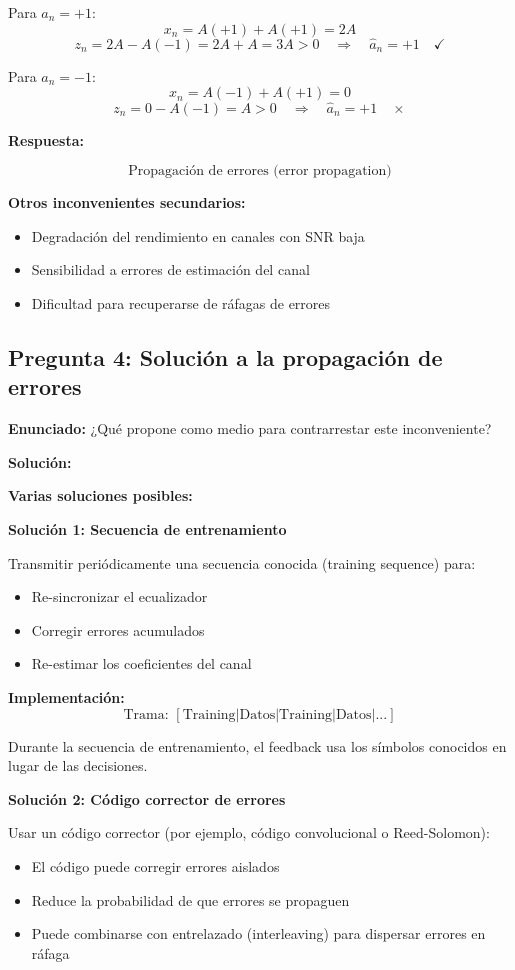 \documentclass[11pt,a4paper]{article}
\begin{document}
Para $a_n = +1$:
\[
x_n = A(+1) + A(+1) = 2A
\]
\[
z_n = 2A - A(-1) = 2A + A = 3A > 0 \quad \Rightarrow \quad \hat{a}_n = +1 \quad \checkmark
\]

Para $a_n = -1$:
\[
x_n = A(-1) + A(+1) = 0
\]
\[
z_n = 0 - A(-1) = A > 0 \quad \Rightarrow \quad \hat{a}_n = +1 \quad \times
\]

\textbf{Respuesta:}

\[
\boxed{\text{Propagación de errores (error propagation)}}
\]

\textbf{Otros inconvenientes secundarios:}
\begin{itemize}
    \item Degradación del rendimiento en canales con SNR baja
    \item Sensibilidad a errores de estimación del canal
    \item Dificultad para recuperarse de ráfagas de errores
\end{itemize}

\subsection*{Pregunta 4: Solución a la propagación de errores}

\textbf{Enunciado:} ¿Qué propone como medio para contrarrestar este inconveniente?

\vspace{0.3cm}
\textbf{Solución:}

\textbf{Varias soluciones posibles:}

\textbf{Solución 1: Secuencia de entrenamiento}

Transmitir periódicamente una secuencia conocida (training sequence) para:
\begin{itemize}
    \item Re-sincronizar el ecualizador
    \item Corregir errores acumulados
    \item Re-estimar los coeficientes del canal
\end{itemize}

\textbf{Implementación:}
\[
\text{Trama: } [\text{Training} | \text{Datos} | \text{Training} | \text{Datos} | ...]
\]

Durante la secuencia de entrenamiento, el feedback usa los símbolos conocidos en lugar de las decisiones.

\textbf{Solución 2: Código corrector de errores}

Usar un código corrector (por ejemplo, código convolucional o Reed-Solomon):
\begin{itemize}
    \item El código puede corregir errores aislados
    \item Reduce la probabilidad de que errores se propaguen
    \item Puede combinarse con entrelazado (interleaving) para dispersar errores en ráfaga
\end{itemize}
\end{document}
